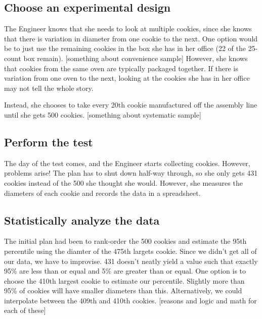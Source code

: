 \documentclass[
]{book}
\theoremstyle{definition}
\theoremstyle{definition}
\theoremstyle{definition}
\theoremstyle{remark}
\begin{document}
\hypertarget{choose-an-experimental-design}{%
\subsection{Choose an experimental design}\label{choose-an-experimental-design}}

The Engineer knows that she needs to look at multiple cookies, since she knows that there is variation in diameter from one cookie to the next. One option would be to just use the remaining cookies in the box she has in her office (22 of the 25-count box remain). {[}something about convenience sample{]} However, she knows that cookies from the same oven are typically packaged together. If there is variation from one oven to the next, looking at the cookies she has in her office may not tell the whole story.

Instead, she chooses to take every 20th cookie manufactured off the assembly line until she gets 500 cookies. {[}something about systematic sample{]}

\hypertarget{perform-the-test}{%
\subsection{Perform the test}\label{perform-the-test}}

The day of the test comes, and the Engineer starts collecting cookies. However, problems arise! The plan has to shut down half-way through, so she only gets 431 cookies instead of the 500 she thought she would. However, she measures the diameters of each cookie and records the data in a spreadsheet.

\hypertarget{statistically-analyze-the-data}{%
\subsection{Statistically analyze the data}\label{statistically-analyze-the-data}}

The initial plan had been to rank-order the 500 cookies and estimate the 95th percentile using the diamter of the 475th largets cookie. Since we didn't get all of our data, we have to improvise. 431 doesn't neatly yield a value such that exactly 95\% are less than or equal and 5\% are greater than or equal. One option is to choose the 410th largest cookie to estimate our percentile. Slightly more than 95\% of cookies will have smaller diameters than this. Alternatively, we could interpolate between the 409th and 410th cookies. {[}reasons and logic and math for each of these{]}
\end{document}
